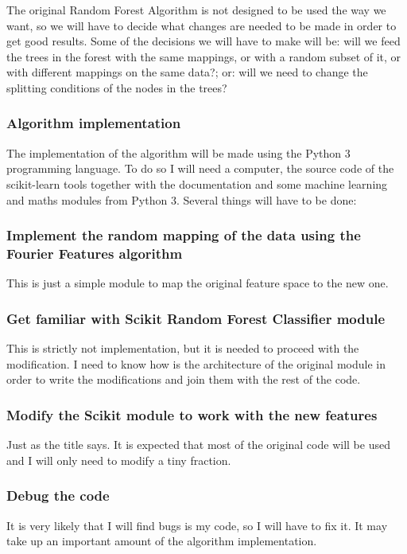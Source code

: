 \documentclass[a4paper]{article}
\begin{document}
                The original Random Forest Algorithm is not designed to be used the way we want, so we will have to decide what changes are needed to be made in order to get good results. Some of the decisions we will have to make will be: will we feed the trees in the forest with the same mappings, or with a random subset of it, or with different mappings on the same data?; or: will we need to change the splitting conditions of the nodes in the trees?


            \subsubsection{Algorithm implementation}
            The implementation of the algorithm will be made using the Python 3 programming language. To do so I will need a computer, the source code of the scikit-learn tools together with the documentation and some machine learning and maths modules from Python 3. Several things will have to be done:

                \subsubsection*{Implement the random mapping of the data using the Fourier Features algorithm}
                This is just a simple module to map the original feature space to the new one.

                \subsubsection*{Get familiar with Scikit Random Forest Classifier module}
                This is strictly not implementation, but it is needed to proceed with the modification. I need to know how is the architecture of the original module in order to write the modifications and join them with the rest of the code.

                \subsubsection*{Modify the Scikit module to work with the new features}
                Just as the title says. It is expected that most of the original code will be used and I will only need to modify a tiny fraction.

                \subsubsection*{Debug the code}
                It is very likely that I will find bugs is my code, so I will have to fix it. It may take up an important amount of the algorithm implementation.
\end{document}
